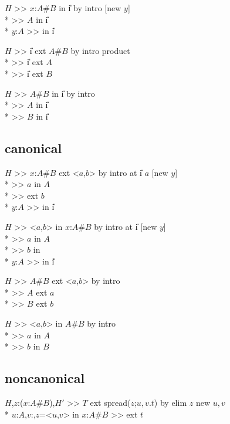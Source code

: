 \goalskip

\goal $H$ >> $x$:$A$\#$B$ in \U{i} by intro [new $y$] \\*
\subgoal >> $A$ in \U{i} \\*
\subgoal $y$:$A$ >>  in \U{i}

\goalskip

\goal $H$ >> \U{i} ext $A$\#$B$ by intro product \\*
\subgoal >> \U{i} ext $A$\\*
\subgoal >> \U{i} ext $B$


\goalskip

\goal $H$ >> $A$\#$B$ in \U{i} by intro \\*
\subgoal >> $A$ in \U{i} \\*
\subgoal >> $B$ in \U{i}

\subsection*{canonical}
\goal $H$ >> $x$:$A$\#$B$ ext <$a$,$b$> by intro at \U{i} $a$ [new $y$] \\*
\subgoal >> $a$ in $A$ \\*
\subgoal >>  ext $b$\\*
\subgoal $y$:$A$ >>  in \U{i}


\goalskip

\goal $H$ >> <$a$,$b$> in $x$:$A$\#$B$ by intro at \U{i} [new $y$] \\*
\subgoal >> $a$ in $A$ \\*
\subgoal >> $b$ in  \\*
\subgoal $y$:$A$ >>  in \U{i}

\goalskip

\goal $H$ >> $A$\#$B$ ext <$a$,$b$> by intro \\*
\subgoal >> $A$ ext $a$ \\*
\subgoal >> $B$ ext $b$


\goalskip

\goal $H$ >> <$a$,$b$> in $A$\#$B$ by intro \\*
\subgoal >> $a$ in $A$ \\*
\subgoal >> $b$ in $B$

\subsection*{noncanonical}
\goal $H$,$z$:($x$:$A$\#$B$),$H'$ >> $T$ 
         ext spread($z$;$u,v$.$t$)
	 by elim $z$ new $u,v$\\*
\subgoal $u$:$A$,$v$:,$z$=<$u$,$v$> in $x$:$A$\#$B$
         >>  ext $t$


